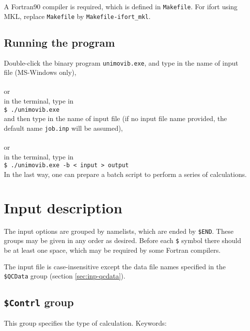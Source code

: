 \documentclass[12pt,english]{extarticle}
\begin{document}
A Fortran90 compiler is required, which is defined in \verb|Makefile|.
For ifort using MKL, replace \verb|Makefile| by \verb|Makefile-ifort_mkl|.

\subsection{Running the program} \label{sec:run}

Double-click the binary program \verb|unimovib.exe|, and type in the name of input file (MS-Windows only), \\ \\
or \\
in the terminal, type in \\
\verb|$ ./unimovib.exe | \\
and then type in the name of input file (if no input file name provided, the default name \verb|job.inp| will be assumed), \\ \\
or \\
in the terminal, type in \\
\verb|$ ./unimovib.exe -b < input > output | \\

In the last way, one can prepare a batch script to perform a series of calculations.

\pagebreak{}


\section{Input description} \label{part:input}

The input options are grouped by namelists, which are ended by \verb|$END|.
These groups may be given in any order as desired. Before each \verb|$| symbol
there should be at least one space, which may be required by some Fortran compilers.

The input file is case-insensitive except the data file names specified in the \verb|$QCData|
group (section \ref{sec:inp-qcdata}).

\subsection{\texttt{\$Contrl} group} \label{sec:inp-contrl}

This group specifies the type of calculation. Keywords:
\end{document}

